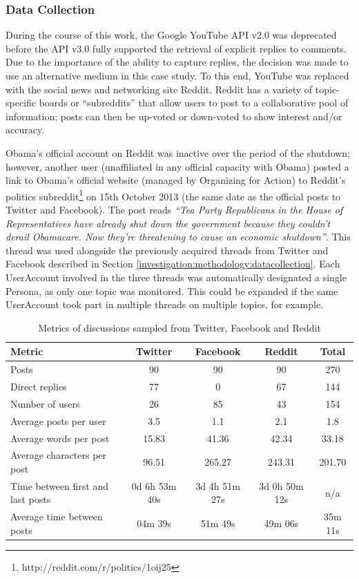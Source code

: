 \subsubsection{Data Collection}
During the course of this work, the Google YouTube API v2.0 was deprecated before the API v3.0 fully supported the retrieval of explicit replies to comments. Due to the importance of the ability to capture replies, the decision was made to use an alternative medium in this case study. To this end, YouTube was replaced with the social news and networking site Reddit. Reddit has a variety of topic-specific boards or ``subreddits'' that allow users to post to a collaborative pool of information; posts can then be up-voted or down-voted to show interest and/or accuracy.

Obama's official account on Reddit was inactive over the period of the shutdown; however, another user (unaffiliated in any official capacity with Obama) posted a link to Obama's official website (managed by Organizing for Action) to Reddit's politics subreddit\footnote{http://reddit.com/r/politics/1oij25} on 15th October 2013 (the same date as the official posts to Twitter and Facebook). The post reads \textit{``Tea Party Republicans in the House of Representatives have already shut down the government because they couldn't derail Obamacare. Now they're threatening to cause an economic shutdown''}. This thread was used alongside the previously acquired threads from Twitter and Facebook described in Section \ref{investigation:methodology:datacollection}. Each UserAccount involved in the three threads was automatically designated a single Persona, as only one topic was monitored. This could be expanded if the same UserAccount took part in multiple threads on multiple topics, for example.


\begin{table}
\centering
\caption{Metrics of discussions sampled from Twitter, Facebook and Reddit}
\label{table:samples}
\begin{tabular}{| l | c | c | c | c |}
\hline
\textbf{Metric} & \textbf{Twitter} & \textbf{Facebook} & \textbf{Reddit} & \textbf{Total}\\
\hline
Posts & 90 & 90 & 90 & 270\\
\hline
Direct replies & 77 & 0 & 67 & 144\\
\hline
Number of users & 26 & 85 & 43 & 154\\
\hline
Average posts per user & 3.5 & 1.1 & 2.1 & 1.8\\
\hline
Average words per post & 15.83 & 41.36 & 42.34 & 33.18\\
\hline
Average characters per post & 96.51 & 265.27 & 243.31 & 201.70\\
\hline
Time between first and last posts & 0d 6h 53m 40s & 3d 4h 51m 27s & 3d 0h 50m 12s & n/a\\
\hline
Average time between posts & 04m 39s & 51m 49s & 49m 06s & 35m 11s\\
\hline

\end{tabular}
\end{table}


